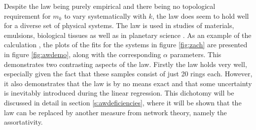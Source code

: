 Despite the \aw{} law being purely empirical and there being no topological requirement for $m_k$ to vary systematically with $k$, the law does seem to hold well for a diverse set of physical systems.
The law is used %
in studies of materials, emulsions, biological tissues as well as in planetary science \cite{LeRoux2013,Roy2018,Noever1992,Mombach1993,Pedro2008}.
As an example of the calculation%
, the plots of the fits for the systems in figure \ref{fig:zach} are presented in figure \ref{fig:awdemo}, along with the corresponding $\alpha$ parameters.
This demonstrates two contrasting aspects of the \aw{} law. 
Firstly the law holds very well, especially given the fact that these samples consist of just 20 rings each.
However, it also demonstrates that the law is by no means exact and that some uncertainty is inevitably introduced during the linear regression.
This dichotomy will be discussed in detail in section \ref{s:awdeficiencies}, where it will be shown that the \aw{} law can be replaced by another measure from network theory, namely the assortativity.
